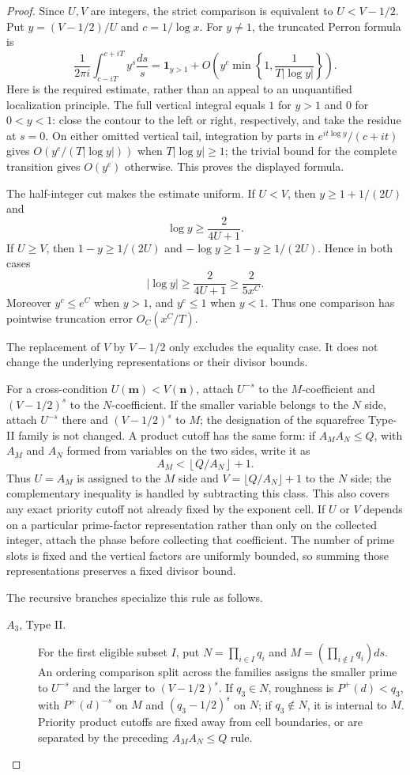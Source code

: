 \documentclass[10pt,reqno]{amsart}
\newcommand{\1}{\mathbf{1}}
\theoremstyle{plain}
\theoremstyle{remark}
\begin{document}
\begin{proof}
Since $U,V$ are integers, the strict comparison is equivalent to
$U<V-1/2$.  Put $y=(V-1/2)/U$ and $c=1/\log x$.  For $y\ne1$, the
truncated Perron formula is
\[
 \frac{1}{2\pi i}\int_{c-iT}^{c+iT}y^s\frac{ds}{s}
 =\1_{y>1}+O\!\left(
 y^c\min\left\{1,\frac1{T|\log y|}\right\}\right).
\]
Here is the required estimate, rather than an appeal to an unquantified
localization principle.  The full vertical integral equals $1$ for $y>1$
and $0$ for $0<y<1$: close the contour to the left or right, respectively,
and take the residue at $s=0$.  On either omitted vertical tail, integration
by parts in
\(e^{it\log y}/(c+it)\) gives $O(y^c/(T|\log y|))$ when
$T|\log y|\ge1$; the trivial bound for the complete transition gives
$O(y^c)$ otherwise.  This proves the displayed formula.

The half-integer cut makes the estimate uniform.  If $U<V$, then
$y\ge1+1/(2U)$ and
\[
 \log y\ge\frac{2}{4U+1}.
\]
If $U\ge V$, then $1-y\ge1/(2U)$ and
$-\log y\ge1-y\ge1/(2U)$.  Hence in both cases
\[
 |\log y|\ge\frac{2}{4U+1}\ge\frac{2}{5x^C}.
\]
Moreover $y^c\le e^C$ when $y>1$, and $y^c\le1$ when $y<1$.
Thus one comparison has pointwise truncation error
$O_C(x^C/T)$.

The replacement of $V$ by $V-1/2$ only excludes the equality case.  It
does not change the underlying representations or their divisor bounds.

For a cross-condition $U(\boldsymbol m)<V(\boldsymbol n)$, attach
$U^{-s}$ to the $M$-coefficient and $(V-1/2)^s$ to the $N$-coefficient.
If the smaller variable belongs to the $N$ side, attach $U^{-s}$ there and
$(V-1/2)^s$ to $M$; the designation of the squarefree Type-II family is not
changed.  A product cutoff has the same form:
if $A_MA_N\le Q$, with $A_M$ and $A_N$ formed from variables on the two
sides, write it as
\[
 A_M<\left\lfloor Q/A_N\right\rfloor+1.
\]
Thus $U=A_M$ is assigned to the $M$ side and
$V=\lfloor Q/A_N\rfloor+1$ to the $N$ side; the complementary inequality is
handled by subtracting this class.  This also covers any exact priority
cutoff not already fixed by the exponent cell.
If $U$ or $V$ depends on a particular prime-factor representation rather
than only on the collected integer, attach the phase before collecting that
coefficient.  The number of prime slots is fixed and the vertical factors
are uniformly bounded, so summing those representations preserves a fixed
divisor bound.

The recursive branches specialize this rule as follows.
\begin{description}
\item[\(A_3\), Type II.]
For the first eligible subset \(I\), put
\(N=\prod_{i\in I}q_i\) and
\(M=(\prod_{i\notin I}q_i)ds\).
An ordering comparison split across the families assigns the smaller prime
to \(U^{-s}\) and the larger to \((V-1/2)^s\).
If \(q_3\in N\), roughness is
\(P^+(d)<q_3\), with \(P^+(d)^{-s}\) on \(M\) and
\((q_3-1/2)^s\) on \(N\); if \(q_3\notin N\), it is internal to \(M\).
Priority product cutoffs are fixed away from cell boundaries, or are
separated by the preceding \(A_MA_N\le Q\) rule.


\end{description}
\end{proof}
\end{document}
